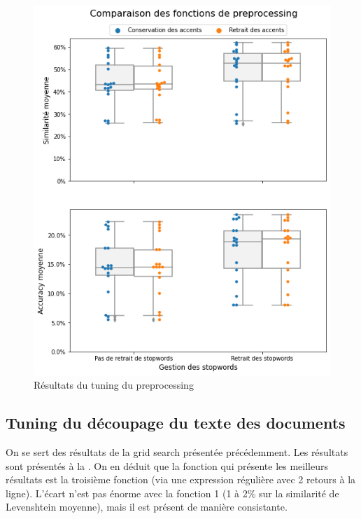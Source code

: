             \begin{figure}[htbp]
                \begin{center}
                \includegraphics[width=0.9\linewidth]{img/tuning_prepro.png}
                \end{center}
                \caption{Résultats du tuning du preprocessing}
                \label{fig:tuning_prepro}
            \end{figure}     

            \subsection{Tuning du découpage du texte des documents}

            On se sert des résultats de la grid search présentée précédemment.
            Les résultats sont présentés à la .
            On en déduit que la fonction qui présente les meilleurs résultats est la troisième fonction (via une expression régulière avec 2 retours à la ligne).
            L'écart n'est pas énorme avec la fonction 1 (1 à 2\% sur la similarité de Levenshtein moyenne), mais il est présent de manière consistante.

